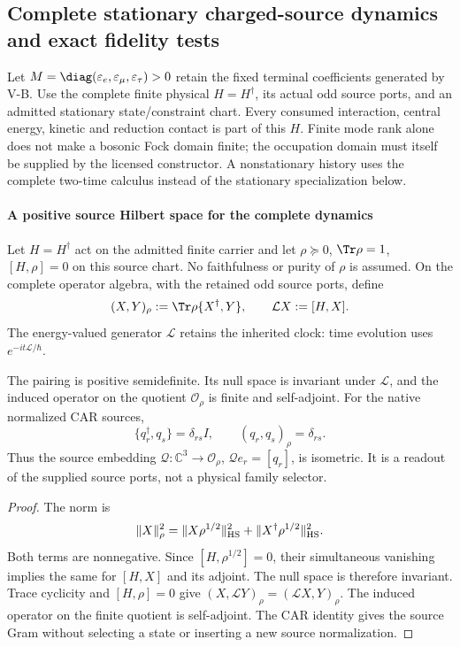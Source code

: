 \documentclass[12pt,a4paper]{article}
\begin{document}






\subsection{Complete stationary charged-source dynamics and exact fidelity tests}
\label{p4:sec:v2168-stationary-charged-response}
Let $M=\diag(\varepsilon_e,\varepsilon_\mu,\varepsilon_\tau)>0$ retain the fixed terminal coefficients generated by V-B. Use the complete finite physical $H=H^\dagger$, its actual
odd source ports, and an admitted stationary state/constraint chart.
Every consumed interaction, central energy, kinetic and reduction contact
is part of this $H$. Finite mode rank alone does not make a bosonic Fock
domain finite; the occupation domain must itself be supplied by the
licensed constructor. A nonstationary history uses the complete two-time
calculus instead of the stationary specialization below.


\paragraph{A positive source Hilbert space for the complete dynamics}
Let $H=H^\dagger$ act on the admitted finite carrier and let
$\rho\succeq0$, $\Tr\rho=1$, $[H,\rho]=0$ on this source chart. No
faithfulness or purity of $\rho$ is assumed. On the complete operator algebra,
with the retained odd source ports, define
\[
 (X,Y)_\rho:=\Tr\rho\{X^\dagger,Y\},\qquad
 \mathcal L X:=[H,X].
\]
The energy-valued generator $\mathcal L$ retains the inherited clock:
time evolution uses $e^{-it\mathcal L/\hbar}$.

\begin{proposition}
\label{p4:prop:v2168-stationary-source-quotient}
The pairing is positive semidefinite. Its null space is invariant under
$\mathcal L$, and the induced operator on the quotient
$\mathscr O_\rho$ is finite and self-adjoint. For the native normalized CAR
sources,
\[
 \{q_r^\dagger,q_s\}=\delta_{rs}I,
 \qquad (q_r,q_s)_\rho=\delta_{rs}.
\]
Thus the source embedding
$\mathcal Q:\mathbb C^3\to\mathscr O_\rho$, $\mathcal Qe_r=[q_r]$, is isometric.
It is a readout of the supplied source ports, not a physical family selector.
\end{proposition}
\begin{proof}
The norm is
\[
 \|X\|_\rho^2
 =\|X\rho^{1/2}\|_{\rm HS}^2+
   \|X^\dagger\rho^{1/2}\|_{\rm HS}^2.
\]
Both terms are nonnegative. Since $[H,\rho^{1/2}]=0$, their simultaneous
vanishing implies the same for $[H,X]$ and its adjoint. The null space is
therefore invariant. Trace cyclicity and $[H,\rho]=0$ give
$(X,\mathcal LY)_\rho=(\mathcal LX,Y)_\rho$. The induced operator on the
finite quotient is self-adjoint. The CAR identity gives the source Gram
without selecting a state or inserting a new source normalization.
\end{proof}
\end{document}
